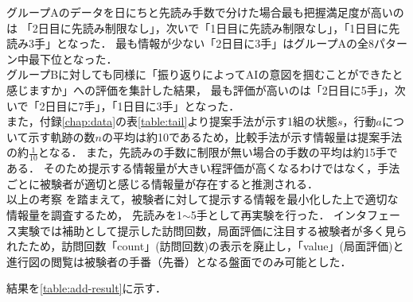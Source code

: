グループAのデータを日にちと先読み手数で分けた場合最も把握満足度が高いのは
「2日目に先読み制限なし」，次いで「1日目に先読み制限なし」，「1日目に先読み3手」となった．
最も情報が少ない「2日目に3手」はグループAの全8パターン中最下位となった．\\


グループBに対しても同様に「振り返りによってAIの意図を掴むことができたと感じますか」への評価を集計した結果，
最も評価が高いのは「2日目に5手」，次いで「2日目に7手」，「1日目に3手」となった．\\



また，付録\ref{chap:data}の表\ref{table:tail}より提案手法が示す1組の状態$s$，行動$a$について示す軌跡の数$n$の平均は約10であるため，比較手法が示す情報量は提案手法の約$\frac{1}{10}$となる．
また，先読みの手数に制限が無い場合の手数の平均は約15手である．
そのため提示する情報量が大きい程評価が高くなるわけではなく，手法ごとに被験者が適切と感じる情報量が存在すると推測される．\\

以上の考察
を踏まえて，被験者に対して提示する情報を最小化した上で適切な情報量を調査するため，
先読みを1$\sim$5手として再実験を行った．
インタフェース実験では補助として提示した訪問回数，局面評価に注目する被験者が多く見られたため，訪問回数「count」(訪問回数)の表示を廃止し，「value」(局面評価)と進行図の閲覧は被験者の手番（先番）となる盤面でのみ可能とした．

結果を\ref{table:add-result}に示す．

\begin{table}[H]
    \caption{先読み手数制限なしの場合(追加実験)}
    \label{table:add-result}
    \scriptsize
    \centering
    
\end{table}


